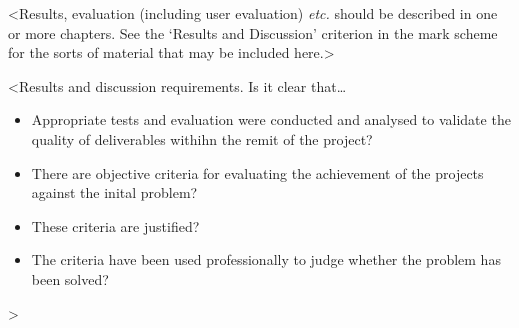 <Results, evaluation (including user evaluation) {\em etc.} should be described in one or more chapters. See the `Results and Discussion' criterion in the mark scheme for the sorts of material that may be included here.>

<Results and discussion requirements. Is it clear that\dots
\begin{itemize}
    \item Appropriate tests and evaluation were conducted and analysed to validate the quality of deliverables withihn the remit of the project?
    \item There are objective criteria for evaluating the achievement of the projects against the inital problem?
    \item These criteria are justified?
    \item The criteria have been used professionally to judge whether the problem has been solved?
\end{itemize}
>

